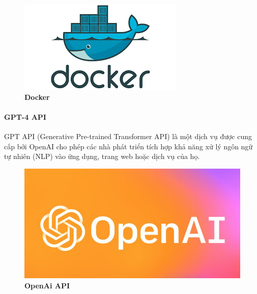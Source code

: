 \begin{figure}[H]
  \centering
  \includegraphics[scale=0.8]{Images/server/deploy/docker.png}
  \caption[Docker]{\bfseries \fontsize{12pt}{0pt}
  \selectfont Docker}
  \label{docker} %
\end{figure}


\paragraph{GPT-4 API}
\mbox{}

GPT API (Generative Pre-trained Transformer API) 
là một dịch vụ được cung cấp bởi OpenAI cho phép các nhà phát triển tích hợp khả năng xử lý ngôn ngữ tự nhiên (NLP) vào ứng dụng, 
trang web hoặc dịch vụ của họ. 

\begin{figure}[H]
  \centering
  \includegraphics[scale=0.9]{Images/server/ai/openai.png}
  \caption[OpenAi API]{\bfseries \fontsize{12pt}{0pt}
  \selectfont OpenAi API}
  \label{openai} %
\end{figure}

